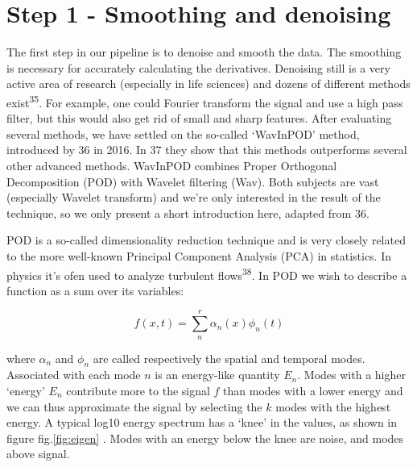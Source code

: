 \documentclass{Dissertate}
\begin{document}
\hypertarget{step-1---smoothing-and-denoising}{%
\section{Step 1 - Smoothing and
denoising}\label{step-1---smoothing-and-denoising}}

The first step in our pipeline is to denoise and smooth the data. The
smoothing is necessary for accurately calculating the derivatives.
Denoising still is a very active area of research (especially in life
sciences) and dozens of different methods exist\textsuperscript{35}. For
example, one could Fourier transform the signal and use a high pass
filter, but this would also get rid of small and sharp features. After
evaluating several methods, we have settled on the so-called `WavInPOD'
method, introduced by 36 in 2016. In 37 they show that this methods
outperforms several other advanced methods. WavInPOD combines Proper
Orthogonal Decomposition (POD) with Wavelet filtering (Wav). Both
subjects are vast (especially Wavelet transform) and we're only
interested in the result of the technique, so we only present a short
introduction here, adapted from 36.

POD is a so-called dimensionality reduction technique and is very
closely related to the more well-known Principal Component Analysis
(PCA) in statistics. In physics it's ofen used to analyze turbulent
flows\textsuperscript{38}. In POD we wish to describe a function as a
sum over its variables:

\[
f(x,t)=\sum_n^r \alpha_n(x)\phi_n(t)
\]

where \(\alpha_n\) and \(\phi_n\) are called respectively the spatial
and temporal modes. Associated with each mode \(n\) is an energy-like
quantity \(E_n\). Modes with a higher `energy' \(E_n\) contribute more
to the signal \(f\) than modes with a lower energy and we can thus
approximate the signal by selecting the \(k\) modes with the highest
energy. A typical log10 energy spectrum has a `knee' in the values, as
shown in figure fig.\ref{fig:eigen} . Modes with an energy below the
knee are noise, and modes above signal.
\end{document}
